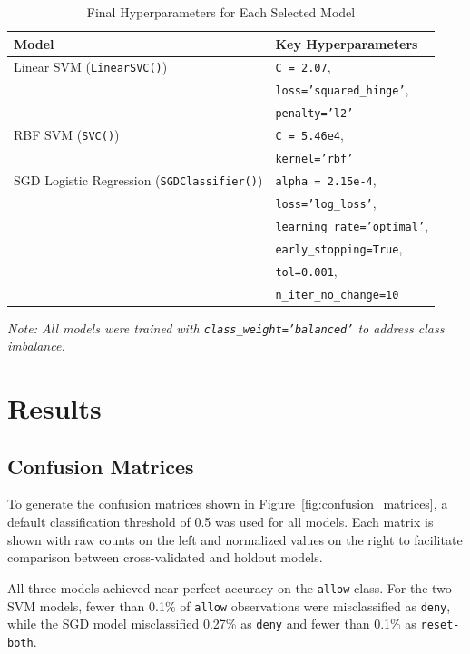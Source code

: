 \documentclass{article}      %
\begin{document}
\begin{table}[h!]
    \centering
    \caption{Final Hyperparameters for Each Selected Model}
    \begin{tabular}{ll}
    \arrayrulecolor{black}
    \toprule
    \textbf{Model} & \textbf{Key Hyperparameters} \\
    \midrule
    Linear SVM (\texttt{LinearSVC()}) & \texttt{C = 2.07}, \\
    & \texttt{loss='squared\_hinge'}, \\
    & \texttt{penalty='l2'} \\
    \midrule
    RBF SVM (\texttt{SVC()}) & \texttt{C = 5.46e4}, \\
    & \texttt{kernel='rbf'} \\
    \midrule
    SGD Logistic Regression (\texttt{SGDClassifier()}) & \texttt{alpha = 2.15e-4}, \\
    & \texttt{loss='log\_loss'}, \\
    & \texttt{learning\_rate='optimal'}, \\
    & \texttt{early\_stopping=True}, \\
    & \texttt{tol=0.001}, \\
    & \texttt{n\_iter\_no\_change=10} \\
    \bottomrule
    \end{tabular}

    \vspace{0.5em}
        \small\textit{Note: All models were trained with \texttt{class\_weight='balanced'} to address class imbalance.}
    \label{table:key_params}
\end{table}

\section{Results}

\subsection{Confusion Matrices}

To generate the confusion matrices shown in Figure~\ref{fig:confusion_matrices}, a default classification threshold of 0.5 was used for all models. Each matrix is shown with raw counts on the left and normalized values on the right to facilitate comparison between cross-validated and holdout models.

All three models achieved near-perfect accuracy on the \texttt{allow} class. For the two SVM models, fewer than 0.1\% of \texttt{allow} observations were misclassified as \texttt{deny}, while the SGD model misclassified 0.27\% as \texttt{deny} and fewer than 0.1\% as \texttt{reset-both}.
\end{document}

